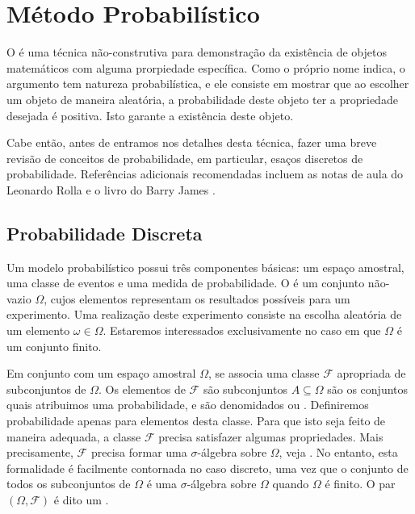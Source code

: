 
\chapter{Método Probabilístico}
\label{chap:prob}


O  é uma técnica não-construtiva para demonstração da existência de objetos matemáticos com alguma prorpiedade específica. Como o próprio nome indica, o argumento tem natureza probabilística, e ele consiste em mostrar que ao escolher um objeto de maneira aleatória, a probabilidade deste objeto ter a propriedade desejada é positiva. Isto garante a existência deste objeto.

Cabe então, antes de entramos nos detalhes desta técnica, fazer uma breve revisão de conceitos de probabilidade, em particular, esaços discretos de probabilidade. Referências adicionais recomendadas incluem as notas de aula do Leonardo Rolla \cite{rolla} e o livro do Barry James \cite{barryjames}.


\section{Probabilidade Discreta}

Um modelo probabilístico possui três componentes básicas: um espaço amostral, uma classe de eventos e uma medida de probabilidade. O  é um conjunto não-vazio $\Omega$, cujos elementos representam os resultados possíveis para um experimento. Uma realização deste experimento consiste na escolha aleatória de um elemento $\omega \in \Omega$. Estaremos interessados exclusivamente no caso em que $\Omega$ é um conjunto finito.

Em conjunto com um espaço amostral $\Omega$, se associa uma classe $\mathcal{F}$ apropriada de subconjuntos de $\Omega$. Os elementos de $\mathcal{F}$ são subconjuntos $A \subseteq \Omega$ são os conjuntos quais atribuimos uma probabilidade, e são denomidados  ou . Definiremos probabilidade apenas para elementos desta classe. Para que isto seja feito de maneira adequada, a classe $\mathcal{F}$ precisa satisfazer algumas propriedades. Mais precisamente, $\mathcal{F}$ precisa formar uma $\sigma$-álgebra sobre $\Omega$, veja \cite{barryjames}.
No entanto, esta formalidade é facilmente contornada no caso discreto, uma vez que o conjunto de todos os subconjuntos de $\Omega$ é uma $\sigma$-álgebra sobre $\Omega$ quando $\Omega$ é finito. O par $(\Omega, \mathcal{F})$ é dito um .

